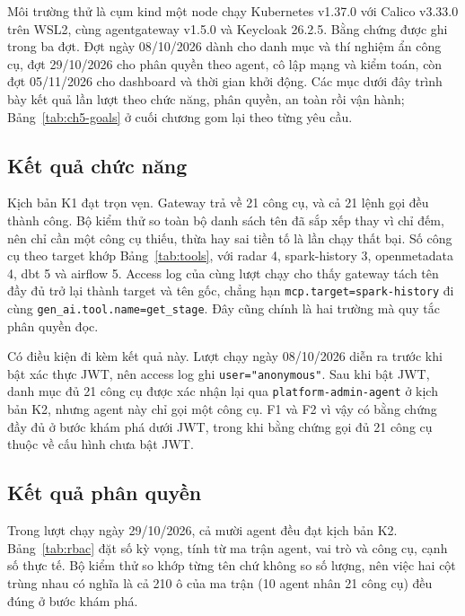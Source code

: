 Môi trường thử là cụm kind một node chạy Kubernetes v1.37.0 với Calico v3.33.0 trên WSL2, cùng agentgateway v1.5.0 và Keycloak 26.2.5. Bằng chứng được ghi trong ba đợt. Đợt ngày 08/10/2026 dành cho danh mục và thí nghiệm ẩn công cụ, đợt 29/10/2026 cho phân quyền theo agent, cô lập mạng và kiểm toán, còn đợt 05/11/2026 cho dashboard và thời gian khởi động. Các mục dưới đây trình bày kết quả lần lượt theo chức năng, phân quyền, an toàn rồi vận hành; Bảng~\ref{tab:ch5-goals} ở cuối chương gom lại theo từng yêu cầu.

\subsection{Kết quả chức năng}

Kịch bản K1 đạt trọn vẹn. Gateway trả về 21 công cụ, và cả 21 lệnh gọi đều thành công. Bộ kiểm thử so toàn bộ danh sách tên đã sắp xếp thay vì chỉ đếm, nên chỉ cần một công cụ thiếu, thừa hay sai tiền tố là lần chạy thất bại. Số công cụ theo target khớp Bảng~\ref{tab:tools}, với radar 4, spark-history 3, openmetadata 4, dbt 5 và airflow 5. Access log của cùng lượt chạy cho thấy gateway tách tên đầy đủ trở lại thành target và tên gốc, chẳng hạn \texttt{mcp.target=spark-history} đi cùng \texttt{gen\_ai.tool.name=get\_stage}. Đây cũng chính là hai trường mà quy tắc phân quyền đọc.

Có điều kiện đi kèm kết quả này. Lượt chạy ngày 08/10/2026 diễn ra trước khi bật xác thực JWT, nên access log ghi \texttt{user="anonymous"}. Sau khi bật JWT, danh mục đủ 21 công cụ được xác nhận lại qua \texttt{platform-admin-agent} ở kịch bản K2, nhưng agent này chỉ gọi một công cụ. F1 và F2 vì vậy có bằng chứng đầy đủ ở bước khám phá dưới JWT, trong khi bằng chứng gọi đủ 21 công cụ thuộc về cấu hình chưa bật JWT.

\subsection{Kết quả phân quyền}

Trong lượt chạy ngày 29/10/2026, cả mười agent đều đạt kịch bản K2. Bảng~\ref{tab:rbac} đặt số kỳ vọng, tính từ ma trận agent, vai trò và công cụ, cạnh số thực tế. Bộ kiểm thử so khớp từng tên chứ không so số lượng, nên việc hai cột trùng nhau có nghĩa là cả 210 ô của ma trận (10 agent nhân 21 công cụ) đều đúng ở bước khám phá.

